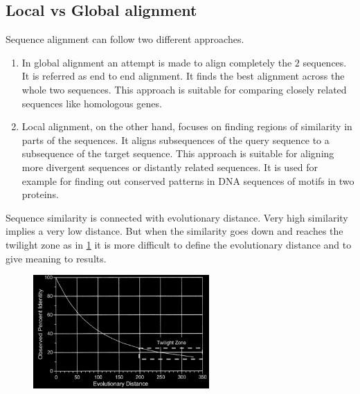     \subsection{Local vs Global alignment}
    Sequence alignment can follow two different approaches.

    \begin{multicols}{2}
        \begin{enumerate}
            \item In global alignment an attempt is made to align completely the $2$ sequences.
                It is referred as end to end alignment.
                It finds the best alignment across the whole two sequences.
                This approach is suitable for comparing closely related sequences like homologous genes.
            \item Local alignment, on the other hand, focuses on finding regions of similarity in parts of the sequences.
                It aligns subsequences of the query sequence to a subsequence of the target sequence.
                This approach is suitable for aligning more divergent sequences or distantly related sequences.
                It is used for example for finding out conserved patterns in DNA sequences of motifs in two proteins.
        \end{enumerate}
    \end{multicols}

    Sequence similarity is connected with evolutionary distance.
    Very high similarity implies a very low distance.
    But when the similarity goes down and reaches the twilight zone as in \ref{evodist} it is more difficult to define the evolutionary distance and to give meaning to results.

    \begin{figure}[h]
        \centering
        \includegraphics[width=0.6\textwidth]{EvolutionaryDistance.png}
        \caption{}
        \label{evodist}
    \end{figure}

